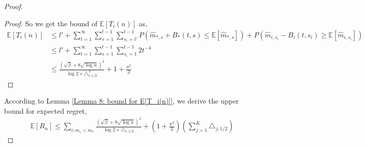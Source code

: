 \documentclass{article}
\theoremstyle{plain}
\begin{document}
\begin{proof}
\begin{proof}
    So we get the bound of $\mathbb{E}[T_i(n)]$ as,
    \begin{align}
        \mathbb{E}[T_i(n)] &\leq l' + \sum_{t = 1}^\infty \sum_{s = 1}^{t-1} \sum_{s_i = l'}^{t-1} P(\hat{m}_{*, s} + B_*(t, s) \leq  \mathbb{E}[\hat{m}_{*, s}]) + P(\hat{m}_{i, s_i} - B_i(t, s_i) \geq \mathbb{E}[\hat{m}_{i, s_i}])\\
        & \leq l' + \sum_{t = 1}^\infty \sum_{s = 1}^{t-1} \sum_{s_i = 1}^{t-1} 2 t^{-4}\\
        & \leq \frac{(\sqrt{\beta} + 8 \sqrt{\log n})^2}{\log 2 \times \triangle_{i, 1/2}^2} + 1 + \frac{\pi^2}{3}
    \end{align}

\end{proof}

According to Lemma \ref{Lemma 8: bound for E[T_i(n)]}, we derive the upper bound for expected regret,
\begin{align}
    \mathbb{E}[R_n] \leq
          \sum_{i: m_i < m_\ast} \frac{(\sqrt{\beta} + 8 \sqrt{\log n})^2}{\log 2 \times \triangle_{i, 1/2}} + (1 + \frac{\pi^2}{3}) (\sum_{j=1}^K \triangle_{j, 1/2})
\end{align}

\end{proof}

\printbibliography
\end{document}
